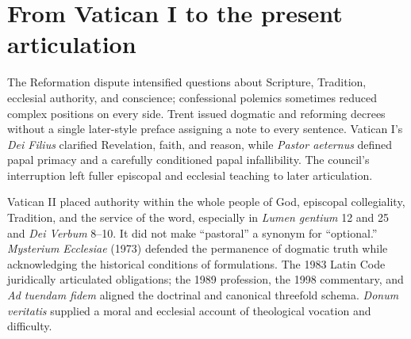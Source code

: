 \section{From Vatican I to the present articulation}

The Reformation dispute intensified questions about Scripture, Tradition,
ecclesial authority, and conscience; confessional polemics sometimes reduced
complex positions on every side. Trent issued dogmatic and reforming decrees
without a single later-style preface assigning a note to every sentence.
Vatican I's \emph{Dei Filius} clarified Revelation, faith, and reason, while
\emph{Pastor aeternus} defined papal primacy and a carefully conditioned papal
infallibility. The council's interruption left fuller episcopal and ecclesial
teaching to later articulation.

Vatican II placed authority within the whole people of God, episcopal
collegiality, Tradition, and the service of the word, especially in
\emph{Lumen gentium} 12 and 25 and \emph{Dei Verbum} 8--10. It did not make
``pastoral'' a synonym for ``optional.'' \emph{Mysterium Ecclesiae} (1973)
defended the permanence of dogmatic truth while acknowledging the historical
conditions of formulations. The 1983 Latin Code juridically articulated
obligations; the 1989 profession, the 1998 commentary, and \emph{Ad tuendam
fidem} aligned the doctrinal and canonical threefold schema. \emph{Donum
veritatis} supplied a moral and ecclesial account of theological vocation and
difficulty.


